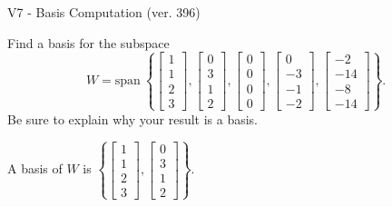 \begin{exercise}
  \begin{exerciseTitle}V7 - Basis Computation (ver. 396)\end{exerciseTitle}
  \begin{exerciseStatement}
    Find a basis for the subspace 
\[W=\mathrm{span}\ \left\{\left[\begin{array}{r}
1 \\
1 \\
2 \\
3
\end{array}\right] , \left[\begin{array}{r}
0 \\
3 \\
1 \\
2
\end{array}\right] , \left[\begin{array}{r}
0 \\
0 \\
0 \\
0
\end{array}\right] , \left[\begin{array}{r}
0 \\
-3 \\
-1 \\
-2
\end{array}\right] , \left[\begin{array}{r}
-2 \\
-14 \\
-8 \\
-14
\end{array}\right]\right\}.\]
 Be sure to explain why your result is a basis.


  \end{exerciseStatement}
  \begin{exerciseAnswer}
   A basis of \(W\) is  \(\left\{\left[\begin{array}{r}
1 \\
1 \\
2 \\
3
\end{array}\right] , \left[\begin{array}{r}
0 \\
3 \\
1 \\
2
\end{array}\right]\right\}\).
  


  \end{exerciseAnswer}
\end{exercise}